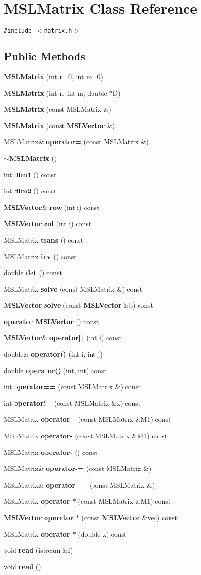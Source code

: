\section{MSLMatrix  Class Reference}
\label{class_MSLMatrix}
{\tt \#include $<$matrix.h$>$}

\subsection*{Public Methods}
\begin{CompactItemize}
\item 
{\bf MSLMatrix} (int n=0, int m=0)
\item 
{\bf MSLMatrix} (int n, int m, double $\ast$D)
\item 
{\bf MSLMatrix} (const MSLMatrix \&)
\item 
{\bf MSLMatrix} (const {\bf MSLVector} \&)
\item 
MSLMatrix\& {\bf operator=} (const MSLMatrix \&)
\item 
{\bf $\sim$MSLMatrix} ()
\item 
int {\bf dim1} () const
\item 
int {\bf dim2} () const
\item 
{\bf MSLVector}\& {\bf row} (int i) const
\item 
{\bf MSLVector} {\bf col} (int i) const
\item 
MSLMatrix {\bf trans} () const
\item 
MSLMatrix {\bf inv} () const
\item 
double {\bf det} () const
\item 
MSLMatrix {\bf solve} (const MSLMatrix \&) const
\item 
{\bf MSLVector} {\bf solve} (const {\bf MSLVector} \&b) const
\item 
{\bf operator MSLVector} () const
\item 
{\bf MSLVector}\& {\bf operator[$\,$]} (int i) const
\item 
double\& {\bf operator()} (int i, int j)
\item 
double {\bf operator()} (int, int) const
\item 
int {\bf operator==} (const MSLMatrix \&) const
\item 
int {\bf operator!=} (const MSLMatrix \&x) const
\item 
MSLMatrix {\bf operator+} (const MSLMatrix \&M1) const
\item 
MSLMatrix {\bf operator-} (const MSLMatrix \&M1) const
\item 
MSLMatrix {\bf operator-} () const
\item 
MSLMatrix\& {\bf operator-=} (const MSLMatrix \&)
\item 
MSLMatrix\& {\bf operator+=} (const MSLMatrix \&)
\item 
MSLMatrix {\bf operator $\ast$} (const MSLMatrix \&M1) const
\item 
{\bf MSLVector} {\bf operator $\ast$} (const {\bf MSLVector} \&vec) const
\item 
MSLMatrix {\bf operator $\ast$} (double x) const
\item 
void {\bf read} (istream \&I)
\item 
void {\bf read} ()
\end{CompactItemize}
